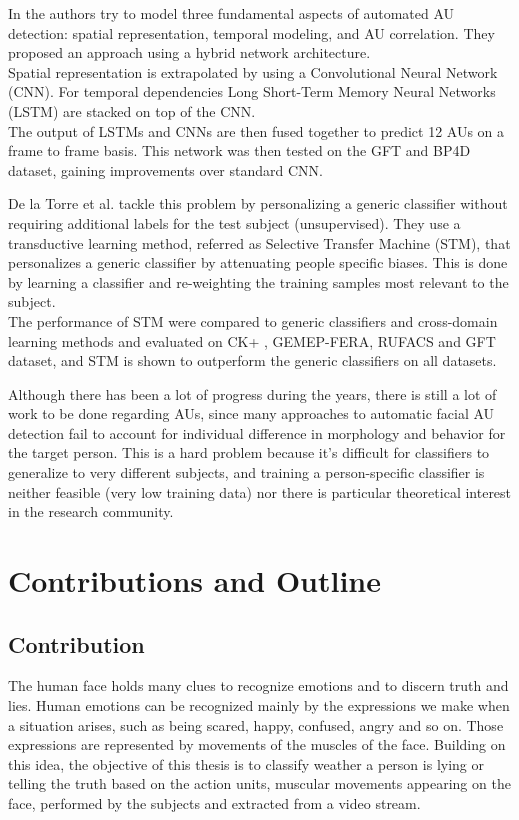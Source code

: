 In \cite{AU_LSTM} the authors try to model three fundamental aspects of automated AU detection: spatial representation, temporal modeling, and AU correlation. They proposed an approach using a hybrid network architecture. \\
Spatial representation is extrapolated by using a Convolutional Neural Network (CNN). For temporal dependencies Long Short-Term Memory Neural Networks (LSTM) are stacked on top of the CNN. \\
The output of LSTMs and CNNs are then fused together to predict 12 AUs on a frame to frame basis. This network was then tested on the GFT and BP4D \cite{BP4D-Spontaneous} dataset, gaining improvements over standard CNN.

De la Torre et al. \cite{AU_STM} \cite{AU_STM2} tackle this problem by personalizing a generic classifier without requiring additional labels for the test subject (unsupervised). They use a transductive learning method, referred as Selective Transfer Machine (STM), that personalizes a generic classifier by attenuating people specific biases. This is done by  learning a classifier and re-weighting the training samples most relevant to the subject. \\
The performance of STM were compared to generic classifiers and cross-domain learning methods and evaluated on CK+ \cite{CK+}, GEMEP-FERA, RUFACS and GFT dataset, and STM is shown to outperform the generic classifiers on all datasets.

Although there has been a lot of progress during the years, there is still a lot of work to be done regarding AUs, since many approaches to automatic facial AU detection fail to account for individual difference in morphology and behavior for the target person. This is a hard problem because it's difficult for classifiers to generalize to very different subjects, and training a person-specific classifier is neither feasible (very low training data) nor there is particular theoretical interest in the research community. 

\clearpage

\section{Contributions and Outline} \label{contrib}

\subsection{Contribution}
The human face holds many clues to recognize emotions and to discern truth and lies. Human emotions can be recognized mainly by the expressions we make when a situation arises, such as being scared, happy, confused, angry and so on. Those expressions are represented by movements of the muscles of the face. Building on this idea, the objective of this thesis is to classify weather a person is lying or telling the truth based on the action units, muscular movements appearing on the face, performed by the subjects and extracted from a video stream. 

